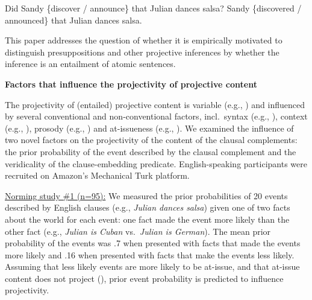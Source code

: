\documentclass[12pt,fleqn]{article}
\newcommand{\6}{\mbox{$[\hspace*{-.6mm}[$}}
\newcommand{\9}{\mbox{$]\hspace*{-.6mm}]$}}
\begin{document}
\vspace*{-.2cm}
\begin{exe}
\ex
\begin{xlist}
\ex\label{embedded} Did Sandy \{discover / announce\} that Julian dances salsa?
\ex\label{unembedded} Sandy \{discovered / announced\} that Julian dances salsa.
\end{xlist}
\end{exe}
\vspace*{-.2cm}

This paper addresses the question of whether it is empirically motivated to distinguish presuppositions and other projective inferences by whether the inference is an entailment of atomic sentences.

{\bf Factors that influence the projectivity of projective content}

The projectivity of (entailed) projective content is variable (e.g., \citealt{karttunen71b,kadmon01,tbd-variability}) and influenced by several conventional and non-conventional factors, incl.\ syntax (e.g., \citealt{potts05}), context (e.g., \citealt{beaver-belly}), prosody (e.g., \citealt{cummins-rohde2015,tonhauser-salt26}) and at-issueness (e.g., \citealt{tbd-variability}). We examined the influence of two novel factors on the projectivity of the content of the clausal complements: the prior probability of the event described by the clausal complement and the veridicality of the clause-embedding predicate. English-speaking participants were recruited on Amazon's Mechanical Turk platform.

\underline{Norming study \#1 (n=95):} We measured the prior probabilities of 20 events described by English clauses (e.g., {\em Julian dances salsa}) given one of two facts about the world for each event: one fact made the event more likely than the other fact (e.g., {\em Julian is Cuban} vs.\ {\em Julian is German}). The mean prior probability of the events was .7 when presented with facts that made the events more likely and .16 when presented with facts that make the events less likely. Assuming that less likely events are more likely to be at-issue, and that at-issue content does not project (\citealt{brst-salt10,tbd-variability}), prior event probability is predicted to influence projectivity.
\end{document}
